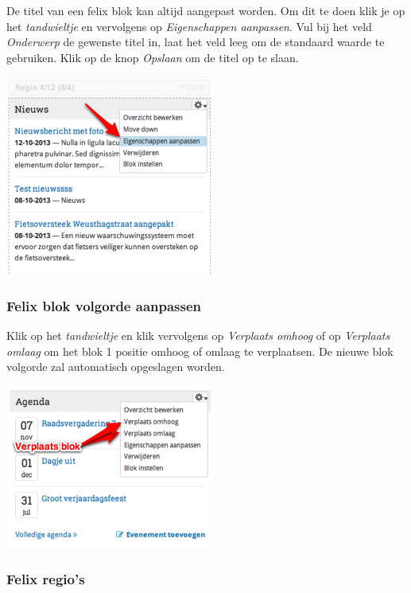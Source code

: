 De titel van een felix blok kan altijd aangepast worden. Om dit te doen klik je op het \emph{tandwieltje} en vervolgens op \emph{Eigenschappen aanpassen}. Vul bij het veld \emph{Onderwerp} de gewenste titel in, laat het veld leeg om de standaard waarde te gebruiken. Klik op de knop \emph{Opslaan} om de titel op te slaan. 

\begin{center}
	\includegraphics[scale=1.0]{img/felix0.png}
\end{center}

\subsubsection{Felix blok volgorde aanpassen}\label{felixblokvolgorde}

Klik op het \emph{tandwieltje} en klik vervolgens op \emph{Verplaats omhoog} of op \emph{Verplaats omlaag} om het blok 1 positie omhoog of omlaag te verplaatsen. De nieuwe blok volgorde zal automatisch opgeslagen worden.

\begin{center}
	\includegraphics[scale=1.0]{img/felix3.png}
\end{center}

\subsubsection{Felix regio's}\label{felixregios}

